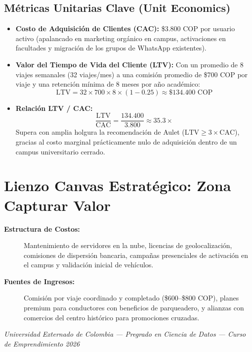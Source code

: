 \documentclass[11pt,a4paper]{article}
\begin{document}
\subsection{M\'etricas Unitarias Clave (Unit Economics)}
\begin{tcolorbox}[colback=accentgreen!5,colframe=accentgreen,title=\textbf{Indicadores de Salud Financiera Unitaria}]
\begin{itemize}
    \item \textbf{Costo de Adquisici\'on de Clientes (CAC):} \$3.800 COP por usuario activo (apalancado en marketing org\'anico en campus, activaciones en facultades y migraci\'on de los grupos de WhatsApp existentes).
    \item \textbf{Valor del Tiempo de Vida del Cliente (LTV):} Con un promedio de 8 viajes semanales (32 viajes/mes) a una comisi\'on promedio de \$700 COP por viaje y una retenci\'on m\'inima de 8 meses por a\~no acad\'emico:
    \[ \text{LTV} = 32 \times 700 \times 8 \times (1 - 0.25) \approx \$134.400 \text{ COP} \]
    \item \textbf{Relaci\'on LTV / CAC:}
    \[ \frac{\text{LTV}}{\text{CAC}} = \frac{134.400}{3.800} \approx 35.3 \times \]
    Supera con amplia holgura la recomendaci\'on de Aulet ($\text{LTV} \ge 3\times \text{CAC}$), gracias al costo marginal pr\'acticamente nulo de adquisici\'on dentro de un campus universitario cerrado.
\end{itemize}
\end{tcolorbox}

\section{Lienzo Canvas Estrat\'egico: Zona Capturar Valor}

\begin{tcolorbox}[colback=primary!5,colframe=primary,title=\textbf{S\'intesis de la Zona Capturar Valor}]
\begin{description}
    \item[\textbf{Estructura de Costos:}] Mantenimiento de servidores en la nube, licencias de geolocalizaci\'on, comisiones de dispersi\'on bancaria, campa\~nas presenciales de activaci\'on en el campus y validaci\'on inicial de veh\'iculos.
    \item[\textbf{Fuentes de Ingresos:}] Comisi\'on por viaje coordinado y completado (\$600--\$800 COP), planes premium para conductores con beneficios de parqueadero, y alianzas con comercios del centro hist\'orico para promociones cruzadas.
\end{description}
\end{tcolorbox}

\vspace{0.5cm}
\begin{center}
\small \textit{Universidad Externado de Colombia --- Pregrado en Ciencia de Datos --- Curso de Emprendimiento 2026}
\end{center}
\end{document}
